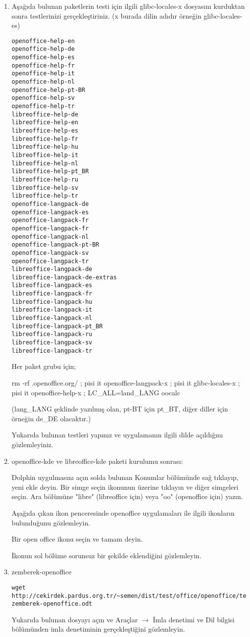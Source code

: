 \documentclass[a4paper,10pt]{article}
\begin{document}
\begin{enumerate}
\item Aşağıda bulunan paketlerin testi için ilgili glibc-locales-x dosyasını kurduktan sonra testlerinizi gerçekleştiriniz. (x burada dilin adıdır örneğin glibc-locales-es)
\begin{verbatim}
openoffice-help-en 
openoffice-help-de
openoffice-help-es
openoffice-help-fr
openoffice-help-it
openoffice-help-nl
openoffice-help-pt-BR
openoffice-help-sv
openoffice-help-tr
libreoffice-help-de
libreoffice-help-en
libreoffice-help-es
libreoffice-help-fr
libreoffice-help-hu
libreoffice-help-it
libreoffice-help-nl
libreoffice-help-pt_BR
libreoffice-help-ru
libreoffice-help-sv
libreoffice-help-tr
openoffice-langpack-de
openoffice-langpack-es
openoffice-langpack-fr
openoffice-langpack-fr
openoffice-langpack-nl
openoffice-langpack-pt-BR
openoffice-langpack-sv
openoffice-langpack-tr
libreoffice-langpack-de
libreoffice-langpack-de-extras
libreoffice-langpack-es
libreoffice-langpack-fr
libreoffice-langpack-hu
libreoffice-langpack-it
libreoffice-langpack-nl
libreoffice-langpack-pt_BR
libreoffice-langpack-ru
libreoffice-langpack-sv
libreoffice-langpack-tr
\end{verbatim}
Her paket grubu için;

rm -rf .openoffice.org/ ; pisi it openoffice-langpack-x ; pisi it glibc-locales-x ; pisi it  openoffice-help-x ; LC\_ALL=land\_LANG oocalc

(lang\_LANG şeklinde yazılmış olan, pt-BT için pt\_BT, diğer diller için örneğin de\_DE olacaktır.)

Yukarıda bulunan testleri yapınız ve uygulamanın ilgili dilde açıldığını gözlemleyiniz.

\item openoffice-kde ve libreoffice-kde paketi kurulumu sonrası:

Dolphin uygulmasını açın solda bulunan Konumlar bölümünde sağ tıklayıp, yeni ekle deyin. Bir simge seçin ikonunun üzerine tıklayın ve diğer simgeleri seçin. Ara bölümüne "libre" (libreoffice için) veya "oo" (openoffice için) yazın.

Aşağıda çıkan ikon penceresinde openoffice uygulamaları ile ilgili ikonların bulunduğunu gözlemleyin.

Bir open office ikonu seçin ve tamam deyin.

İkonun sol bölüme sorunsuz bir şekilde eklendiğini gözlemleyin.

\item zemberek-openoffice

\begin{verbatim}
wget http://cekirdek.pardus.org.tr/~semen/dist/test/office/openoffice/test-zemberek-openoffice.odt
\end{verbatim}

Yukarıda bulunan dosyayı açın ve Araçlar $\rightarrow$ İmla denetimi ve Dil bilgisi bölümünden imla denetiminin gerçekleştiğini gözlemleyin.
\end{enumerate}
\end{document}

